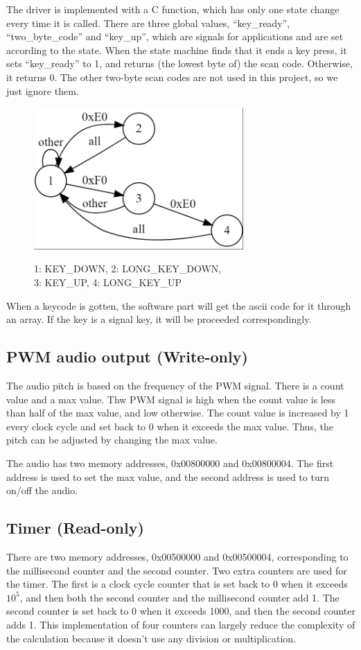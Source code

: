 \documentclass[
	a4paper, %
	11pt, %
]{CSUniSchoolLabReport}
\begin{document}
The driver is implemented with a C function, which has only one state change every time it is called. There are three global values, ``key\_ready'', ``two\_byte\_code'' and ``key\_up'', which are signals for applications and are set according to the state. When the state machine finds that it ends a key press, it sets ``key\_ready'' to 1, and returns (the lowest byte of) the scan code. Otherwise, it returns 0. The other two-byte scan codes are not used in this project, so we just ignore them.

\begin{figure}[!htb]
    \centering
    \includegraphics[width=8cm]{image1.png}
    \par 1: KEY\_DOWN, 2: LONG\_KEY\_DOWN, \\ 3: KEY\_UP, 4: LONG\_KEY\_UP
    \label{fig:image1}

\end{figure}

When a keycode is gotten, the software part will get the ascii code for it through an array. If the key is a signal key, it will be proceeded correspondingly.


\subsection{PWM audio output (Write-only)}
The audio pitch is based on the frequency of the PWM signal. There is a count value and a max value. Thw PWM signal is high when the count value is less than half of the max value, and low otherwise. The count value is increased by 1 every clock cycle and set back to 0 when it exceeds the max value. Thus, the pitch can be adjusted by changing the max value.

The audio has two memory addresses, 0x00800000 and 0x00800004. The first address is used to set the max value, and the second address is used to turn on/off the audio.

\subsection{Timer (Read-only)}
There are two memory addresses, 0x00500000 and 0x00500004, corresponding to the millisecond counter and the second counter. Two extra counters are used for the timer. The first is a clock cycle counter that is set back to 0 when it exceeds $10^5$, and then both the second counter and the millisecond counter add 1. The second counter is set back to 0 when it exceeds 1000, and then the second counter adds 1. This implementation of four counters can largely reduce the complexity of the calculation because it doesn't use any division or multiplication.
\end{document}
